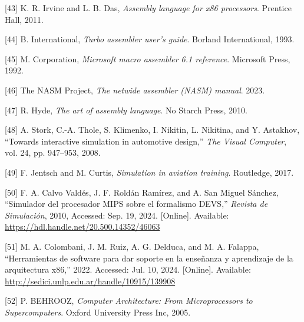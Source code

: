 \documentclass[12pt,oneside]{templates/unerthesis}
\newcommand{\CSLLeftMargin}[1]{#1} %
\newcommand{\CSLRightInline}[1]{#1} %
\newlength{\cslhangindent}
\newenvironment{CSLReferences}[2] %
 {\setlength{\parindent}{0pt}%
  \setlength{\leftskip}{#1 pt\relax}%
  \setlength{\parskip}{#2 pt\relax}%
  \everypar{\setlength{\hangindent}{\cslhangindent}}}
 {\par}
\begin{document}
\begin{CSLReferences}{0}{0}
\leavevmode{}%
\CSLLeftMargin{{[}43{]} }%
\CSLRightInline{K. R. Irvine and L. B. Das, \emph{Assembly language for x86 processors}. Prentice Hall, 2011.}

\leavevmode{}%
\CSLLeftMargin{{[}44{]} }%
\CSLRightInline{B. International, \emph{Turbo assembler user's guide}. Borland International, 1993.}

\leavevmode{}%
\CSLLeftMargin{{[}45{]} }%
\CSLRightInline{M. Corporation, \emph{Microsoft macro assembler 6.1 reference}. Microsoft Press, 1992.}

\leavevmode{}%
\CSLLeftMargin{{[}46{]} }%
\CSLRightInline{The NASM Project, \emph{The netwide assembler (NASM) manual}. 2023.}

\leavevmode{}%
\CSLLeftMargin{{[}47{]} }%
\CSLRightInline{R. Hyde, \emph{The art of assembly language}. No Starch Press, 2010.}

\leavevmode{}%
\CSLLeftMargin{{[}48{]} }%
\CSLRightInline{A. Stork, C.-A. Thole, S. Klimenko, I. Nikitin, L. Nikitina, and Y. Astakhov, {``Towards interactive simulation in automotive design,''} \emph{The Visual Computer}, vol. 24, pp. 947--953, 2008.}

\leavevmode{}%
\CSLLeftMargin{{[}49{]} }%
\CSLRightInline{F. Jentsch and M. Curtis, \emph{Simulation in aviation training}. Routledge, 2017.}

\leavevmode{}%
\CSLLeftMargin{{[}50{]} }%
\CSLRightInline{F. A. Calvo Valdés, J. F. Roldán Ramírez, and A. San Miguel Sánchez, {``Simulador del procesador {MIPS} sobre el formalismo {DEVS},''} \emph{Revista de Simulación}, 2010, Accessed: Sep. 19, 2024. {[}Online{]}. Available: \url{https://hdl.handle.net/20.500.14352/46063}}

\leavevmode{}%
\CSLLeftMargin{{[}51{]} }%
\CSLRightInline{M. A. Colombani, J. M. Ruiz, A. G. Delduca, and M. A. Falappa, {``Herramientas de software para dar soporte en la enseñanza y aprendizaje de la arquitectura x86,''} 2022. Accessed: Jul. 10, 2024. {[}Online{]}. Available: \url{http://sedici.unlp.edu.ar/handle/10915/139908}}

\leavevmode{}%
\CSLLeftMargin{{[}52{]} }%
\CSLRightInline{P. BEHROOZ, \emph{Computer {Architecture}: {From} {Microprocessors} to {Supercomputers}}. Oxford University Press Inc, 2005.}

\end{CSLReferences}
\end{document}
